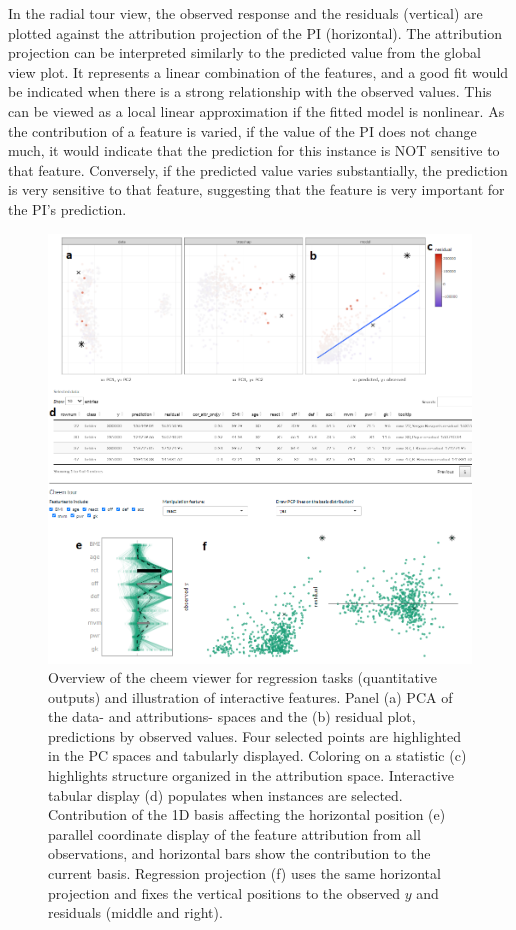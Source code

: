 \documentclass[11pt,twoside]{article}
\begin{document}
In the radial tour view, the observed response and the residuals (vertical) are plotted against the attribution projection of the PI (horizontal). The attribution projection can be interpreted similarly to the predicted value from the global view plot. It represents a linear combination of the features, and a good fit would be indicated when there is a strong relationship with the observed values. This can be viewed as a local linear approximation if the fitted model is nonlinear. As the contribution of a feature is varied, if the value of the PI does not change much, it would indicate that the prediction for this instance is NOT sensitive to that feature. Conversely, if the predicted value varies substantially, the prediction is very sensitive to that feature, suggesting that the feature is very important for the PI's prediction.

\begin{figure}

{\centering \includegraphics[width=1\linewidth]{./figures/app_regression_interactions} 

}

\caption{Overview of the cheem viewer for regression tasks (quantitative outputs) and illustration of interactive features. Panel (a) PCA of the data- and attributions- spaces and the (b) residual plot, predictions by observed values. Four selected points are highlighted in the PC spaces and tabularly displayed. Coloring on a statistic (c) highlights structure organized in the attribution space. Interactive tabular display (d) populates when instances are selected. Contribution of the 1D basis affecting the horizontal position (e) parallel coordinate display of the feature attribution from all observations, and horizontal bars show the contribution to the current basis. Regression projection (f) uses the same horizontal projection and fixes the vertical positions to the observed $y$ and residuals (middle and right).}\label{fig:regressioncase}
\end{figure}
\end{document}
